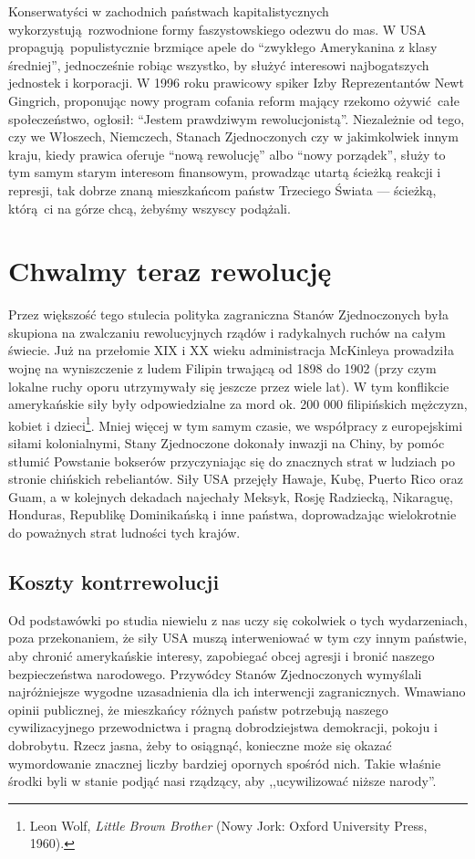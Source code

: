 \documentclass[12pt]{book}
\newcommand{\sekcja}[1]{
  \addcontentsline{toc}{section}{#1}
  \section*{#1}
}
\begin{document}
Konserwatyści w zachodnich państwach kapitalistycznych wykorzystują rozwodnione formy faszystowskiego odezwu do mas. W USA propagują populistycznie brzmiące apele do ``zwykłego Amerykanina z klasy średniej'', jednocześnie robiąc wszystko, by służyć interesowi najbogatszych jednostek i korporacji. W 1996 roku prawicowy spiker Izby Reprezentantów Newt Gingrich, proponując nowy program cofania reform mający rzekomo ożywić całe społeczeństwo, ogłosił: ``Jestem prawdziwym rewolucjonistą''. Niezależnie od tego, czy we Włoszech, Niemczech, Stanach Zjednoczonych czy w jakimkolwiek innym kraju, kiedy prawica oferuje ``nową rewolucję'' albo ``nowy porządek'', służy to tym samym starym interesom finansowym, prowadząc utartą ścieżką reakcji i represji, tak dobrze znaną mieszkańcom państw Trzeciego Świata — ścieżką, którą ci na górze chcą, żebyśmy wszyscy podążali.

\chapter{Chwalmy teraz rewolucję}
Przez większość tego stulecia polityka zagraniczna Stanów Zjednoczonych była skupiona na zwalczaniu rewolucyjnych rządów i radykalnych ruchów na całym świecie. Już na przełomie XIX i XX wieku administracja McKinleya prowadziła wojnę na wyniszczenie z ludem Filipin trwającą od 1898 do 1902 (przy czym lokalne ruchy oporu utrzymywały się jeszcze przez wiele lat). W tym konflikcie amerykańskie siły były odpowiedzialne za mord ok. 200 000 filipińskich mężczyzn, kobiet i dzieci\footnote{Leon Wolf, \textit{Little Brown Brother} (Nowy Jork: Oxford University Press, 1960).}. Mniej więcej w tym samym czasie, we współpracy z europejskimi siłami kolonialnymi, Stany Zjednoczone dokonały inwazji na Chiny, by pomóc stłumić Powstanie bokserów przyczyniając się do znacznych strat w ludziach po stronie chińskich rebeliantów. Siły USA przejęły Hawaje, Kubę, Puerto Rico oraz Guam, a w kolejnych dekadach najechały Meksyk, Rosję Radziecką, Nikaraguę, Honduras, Republikę Dominikańską i inne państwa, doprowadzając wielokrotnie do poważnych strat ludności tych krajów.

\sekcja{Koszty kontrrewolucji}
Od podstawówki po studia niewielu z nas uczy się cokolwiek o tych wydarzeniach, poza przekonaniem, że siły USA muszą interweniować w tym czy innym państwie, aby chronić amerykańskie interesy, zapobiegać obcej agresji i bronić naszego bezpieczeństwa narodowego. Przywódcy Stanów Zjednoczonych wymyślali najróżniejsze wygodne uzasadnienia dla ich interwencji zagranicznych. Wmawiano opinii publicznej, że mieszkańcy różnych państw potrzebują naszego cywilizacyjnego przewodnictwa i pragną dobrodziejstwa demokracji, pokoju i dobrobytu. Rzecz jasna, żeby to osiągnąć, konieczne może się okazać wymordowanie znacznej liczby bardziej opornych spośród nich. Takie właśnie środki byli w stanie podjąć nasi rządzący, aby ,,ucywilizować niższe narody''.
\end{document}
